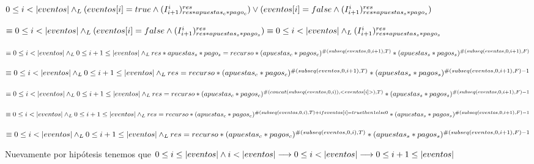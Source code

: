\documentclass[10pt,a4paper]{article}
\begin{document}
$ 0 \leq i < |eventos| \land _L (eventos[i] = true \land (I^{i}_{i+1})^{res}_{res*apuestas_c * pago_c}) \lor (eventos[i] = false \land (I^{i}_{i+1})^{res}_{res*apuestas_s * pago_s})$
\vspace{8pt}

$\equiv 0 \leq i < |eventos| \land _L (eventos[i] = false \land (I^{i}_{i+1})^{res}_{res*apuestas_s * pago_s}) \equiv 0 \leq i < |eventos| \land _L (I^{i}_{i+1})^{res}_{res*apuestas_s * pago_s}$
\vspace{8pt}

$\equiv 0 \leq i < \longitud{eventos} \yLuego 0 \leq i + 1 \leq \longitud{eventos} \yLuego \newline res*apuestas_s * pago_s = recurso*(apuestas_c * pagos_c)^{\#(subseq(eventos, 0, i + 1), T)}*(apuestas_s * pagos_s)^{\#(subseq(eventos, 0, i + 1), F)}$
\vspace{8pt}

$\equiv 0 \leq i < \longitud{eventos} \yLuego 0 \leq i + 1 \leq \longitud{eventos} \yLuego 
\newline res = recurso*(apuestas_c * pagos_c)^{\#(subseq(eventos, 0, i + 1), T)}*(apuestas_s * pagos_s)^{\#(subseq(eventos, 0, i + 1), F) - 1}$
\vspace{8pt}

$\equiv 0 \leq i < \longitud{eventos} \yLuego 0 \leq i + 1 \leq \longitud{eventos} \yLuego 
\newline res = recurso*(apuestas_c * pagos_c)^{\#(concat(subseq(eventos, 0,i)),<eventos[i]>), T)}*(apuestas_s * pagos_s)^{\#(subseq(eventos, 0, i + 1), F) - 1}$
\vspace{8pt}

$\equiv 0 \leq i < \longitud{eventos} \yLuego 0 \leq i + 1 \leq \longitud{eventos} \yLuego 
\newline res = recurso*(apuestas_c * pagos_c)^{\#(subseq(eventos, 0,i), T) + if eventos[i] = true then 1 else 0}*(apuestas_s * pagos_s)^{\#(subseq(eventos, 0, i + 1), F) - 1}$
\vspace{8pt}

$\equiv 0 \leq i < \longitud{eventos} \yLuego 0 \leq i + 1 \leq \longitud{eventos} \yLuego 
\newline res = recurso*(apuestas_c * pagos_c)^{\#(subseq(eventos, 0,i), T)}*(apuestas_s * pagos_s)^{\#(subseq(eventos, 0, i + 1), F) - 1}$
\vspace{8pt}

Nuevamente por hipótesis tenemos que $0 \leq i \leq |eventos| \land i < |eventos| \longrightarrow 0 \leq i < |eventos| \longrightarrow 0 \leq i + 1 \leq |eventos|$
\vspace{8pt}
\end{document}
